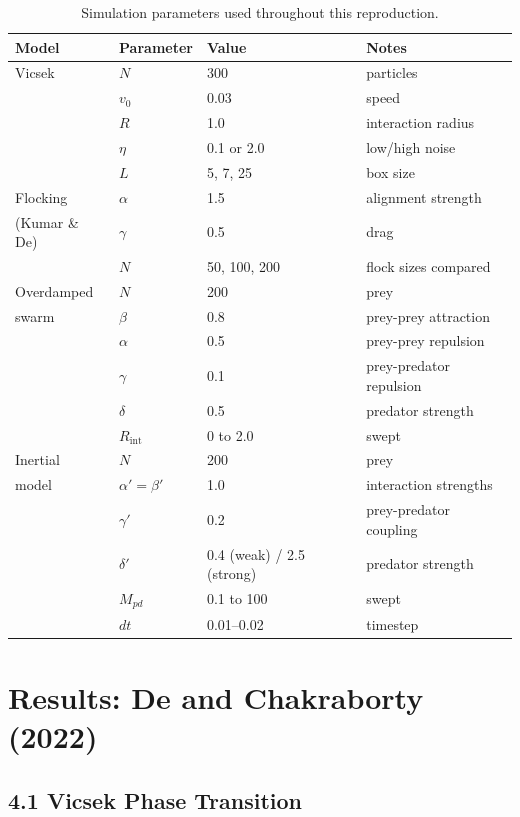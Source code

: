\documentclass[11pt,a4paper]{article}
\begin{document}
\begin{table}[H]
\centering
\caption{Simulation parameters used throughout this reproduction.}
\begin{tabular}{llll}
\toprule
\textbf{Model} & \textbf{Parameter} & \textbf{Value} & \textbf{Notes} \\
\midrule
Vicsek & $N$ & 300 & particles \\
       & $v_0$ & 0.03 & speed \\
       & $R$ & 1.0 & interaction radius \\
       & $\eta$ & 0.1 or 2.0 & low/high noise \\
       & $L$ & 5, 7, 25 & box size \\
\midrule
Flocking & $\alpha$ & 1.5 & alignment strength \\
(Kumar \& De) & $\gamma$ & 0.5 & drag \\
       & $N$ & 50, 100, 200 & flock sizes compared \\
\midrule
Overdamped & $N$ & 200 & prey \\
swarm & $\beta$ & 0.8 & prey-prey attraction \\
       & $\alpha$ & 0.5 & prey-prey repulsion \\
       & $\gamma$ & 0.1 & prey-predator repulsion \\
       & $\delta$ & 0.5 & predator strength \\
       & $R_\mathrm{int}$ & 0 to 2.0 & swept \\
\midrule
Inertial & $N$ & 200 & prey \\
model & $\alpha'=\beta'$ & 1.0 & interaction strengths \\
       & $\gamma'$ & 0.2 & prey-predator coupling \\
       & $\delta'$ & 0.4 (weak) / 2.5 (strong) & predator strength \\
       & $M_{pd}$ & 0.1 to 100 & swept \\
       & $dt$ & 0.01--0.02 & timestep \\
\bottomrule
\end{tabular}
\end{table}

\section{Results: De and Chakraborty (2022)}

\subsection{4.1 Vicsek Phase Transition}
\end{document}
